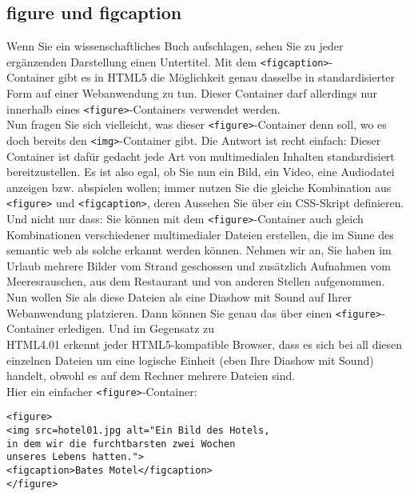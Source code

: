 \subsection{figure und figcaption}

Wenn Sie ein wissenschaftliches Buch aufschlagen, sehen Sie zu jeder \\ergänzenden Darstellung einen Untertitel. Mit dem \verb|<figcaption>|-\\Container gibt es in HTML5 die Möglichkeit genau dasselbe in standardisierter Form auf einer Webanwendung zu tun. Dieser Container darf allerdings nur innerhalb eines \verb|<figure>|-Containers verwendet werden.\\

Nun fragen Sie sich vielleicht, was dieser \verb|<figure>|-Container denn soll, wo es doch bereits den \verb|<img>|-Container gibt. Die Antwort ist recht einfach: Dieser Container ist dafür gedacht jede Art von multimedialen Inhalten standardisiert bereitzustellen. Es ist also egal, ob Sie nun ein Bild, ein Video, eine Audiodatei anzeigen bzw. abspielen wollen; immer nutzen Sie die gleiche Kombination aus \verb|<figure>| und \verb|<figcaption>|, deren Aussehen Sie über ein CSS-Skript definieren.\\

Und nicht nur dass: Sie können mit dem \verb|<figure>|-Container auch gleich Kombinationen verschiedener multimedialer Dateien erstellen, die im Sinne des semantic web als solche erkannt werden können. Nehmen wir an, Sie haben im Urlaub mehrere Bilder vom Strand geschossen und zusätzlich Aufnahmen vom Meeresrauschen, aus dem Restaurant und von anderen Stellen aufgenommen. Nun wollen Sie als diese Dateien als eine Diashow mit Sound auf Ihrer Webanwendung platzieren. Dann können Sie genau das über einen \verb|<figure>|-Container erledigen. Und im Gegensatz zu\\ HTML4.01 erkennt jeder HTML5-kompatible Browser, dass es sich bei all diesen einzelnen Dateien um eine logische Einheit (eben Ihre Diashow mit Sound) handelt, obwohl es auf dem Rechner mehrere Dateien sind.\\

Hier ein einfacher \verb|<figure>|-Container:

\begin{verbatim}
<figure>
<img src=hotel01.jpg alt="Ein Bild des Hotels, 
in dem wir die furchtbarsten zwei Wochen 
unseres Lebens hatten.">
<figcaption>Bates Motel</figcaption>
</figure>
\end{verbatim}

